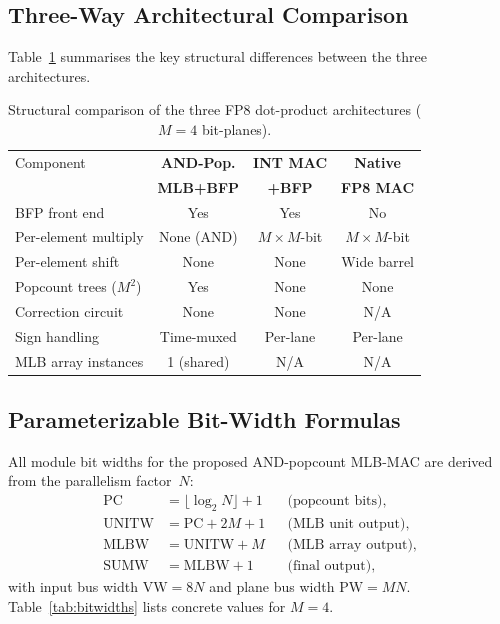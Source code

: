 \documentclass[conference]{IEEEtran}
\begin{document}
\subsection{Three-Way Architectural Comparison}
\label{ssec:comparison}

Table~\ref{tab:3way} summarises the key structural differences
between the three architectures.

\begin{table}[htbp]
\centering
\caption{Structural comparison of the three FP8 dot-product
architectures ($M = 4$ bit-planes).}
\label{tab:3way}
\footnotesize
\begin{tabular}{lccc}
\toprule
Component & \textbf{AND-Pop.} & \textbf{INT MAC} & \textbf{Native} \\
          & \textbf{MLB+BFP} & \textbf{+BFP}   & \textbf{FP8 MAC} \\
\midrule
BFP front end        & Yes  & Yes  & No  \\
Per-element multiply & None (AND) & $M{\times}M$-bit & $M{\times}M$-bit \\
Per-element shift    & None & None & Wide barrel \\
Popcount trees ($M^2$) & Yes  & None & None \\
Correction circuit   & None & None & N/A \\
Sign handling        & Time-muxed & Per-lane & Per-lane \\
MLB array instances  & 1 (shared) & N/A & N/A \\
\bottomrule
\end{tabular}
\end{table}

\subsection{Parameterizable Bit-Width Formulas}
\label{ssec:bitwidths}

All module bit widths for the proposed AND-popcount MLB-MAC are
derived from the parallelism factor~$N$:
\begin{align}
    \text{PC} &= \lfloor \log_2 N \rfloor + 1
    & &\text{(popcount bits)}, \label{eq:pc} \\
    \text{UNITW} &= \text{PC} + 2M + 1
    & &\text{(MLB unit output)}, \label{eq:unitw} \\
    \text{MLBW} &= \text{UNITW} + M
    & &\text{(MLB array output)}, \label{eq:mlbw} \\
    \text{SUMW} &= \text{MLBW} + 1
    & &\text{(final output)}, \label{eq:sumw}
\end{align}
with input bus width $\text{VW} = 8N$ and plane bus width
$\text{PW} = MN$.  Table~\ref{tab:bitwidths} lists concrete
values for $M = 4$.
\end{document}
